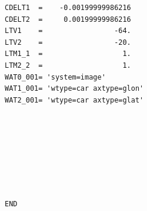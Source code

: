 \documentclass[12pt,preprint]{aastex}
\begin{document}
\begin{appendix}
\begin{verbatim}
CDELT1  =    -0.00199999986216                                                  
CDELT2  =     0.00199999986216                                                  
LTV1    =                 -64.                                                  
LTV2    =                 -20.                                                  
LTM1_1  =                   1.                                                  
LTM2_2  =                   1.                                                  
WAT0_001= 'system=image'                                                        
WAT1_001= 'wtype=car axtype=glon'                                               
WAT2_001= 'wtype=car axtype=glat'                                               
                                                                                
                                                                                
                                                                                
                                                                                
                                                                                
                                                                                
                                                                                
                                                                                
END                                                          

\end{verbatim}

\end{appendix}

\pagebreak

%
\end{document}
